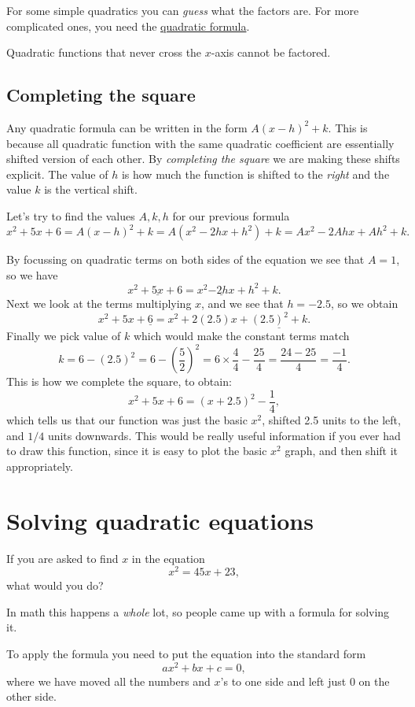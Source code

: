 \documentclass[journal]{IEEEtran}
\newcommand{\dokutitleleveltwo}[1]{\section{#1}}
\newcommand{\dokutitleleveltree}[1]{\subsection{#1}}
\newcommand{\dokuitalic}[1]{\textsl{#1}}
\begin{document}
For some simple quadratics you can \dokuitalic{guess} what the factors are.
For more complicated ones, you need the \hyperref[470dad9cac00a9924004d164cb491a31]{quadratic formula}.

Quadratic functions that never cross the \(x\)-axis cannot be factored.


\dokutitleleveltree{Completing the square}
\label{b94fc77efd4263b48096cc83d6dee58b}%

Any quadratic formula can be written in the form \(A(x-h)^2+k\).
This is because all quadratic function with the same quadratic coefficient 
are essentially shifted version of each other. 
By \dokuitalic{completing the square} we are making these shifts explicit. 
The value of \(h\) is how much the function is shifted to the \dokuitalic{right} and
the value \(k\) is the vertical shift.

Let's try to find the values \(A,k,h\) for our previous formula
\[
  x^2+5x+6  =   A(x-h)^2+k = A(x^2-2hx + h^2) + k = Ax^2 - 2Ahx + Ah^2 + k.
\]

By focussing on quadratic terms on both sides of the equation
we see that \(A=1\), so we have
\[
  x^2+\underline{5x}+6 =  x^2  \underline{-2hx} + h^2 + k.
\]
Next we look at the terms multiplying \(x\), and we see that \(h=-2.5\),
so we obtain
\[
  x^2+5x+\underline{6} =  x^2+ 2(2.5)x + \underline{(2.5)^2 + k}.
\]
Finally we pick value of \(k\) which would make the constant terms match
\[
 k = 6 - (2.5)^2 = 6 - \left(\frac{5}{2}\right)^2 = 6 \times \frac{4}{4} - \frac{25}{4} = \frac{24 - 25}{4} = \frac{-1}{4}.
\]
This is how we complete the square, to obtain:
\[
  x^2+5x+6  = (x+2.5)^2 - \frac{1}{4},
\]
which tells us that our function was just the basic \(x^2\), shifted 2.5 units to the left, and \(1/4\) units downwards.
This would be really useful information if you ever had to draw this function, since it is easy to plot the basic \(x^2\) graph, and then shift
it appropriately.




\dokutitleleveltwo{Solving quadratic equations}
\label{194a7a851bde33e69ef4857d4aec9049}%

If you are asked to find \(x\) in the equation 
\[
  x^2 = 45x + 23,
\]
what would you do?

In math this happens a \dokuitalic{whole} lot, so people came up with a 
formula for solving it.

To apply the formula you need to put the equation into the
standard form
\[
  ax^2 + bx + c = 0,
\]
where we have moved all the numbers and \(x\)'s to one side and left 
just \(0\) on the other side.
\end{document}

